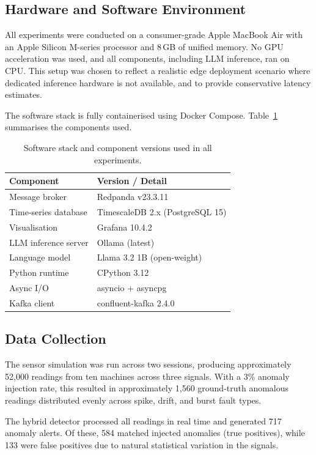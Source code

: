 \documentclass[11pt, a4paper]{article}
\begin{document}
\subsection{Hardware and Software Environment}

All experiments were conducted on a consumer-grade Apple MacBook Air 
with an Apple Silicon M-series processor and 8\,GB of unified memory. 
No GPU acceleration was used, and all components, including LLM 
inference, ran on CPU. This setup was chosen to reflect a realistic 
edge deployment scenario where dedicated inference hardware is not 
available, and to provide conservative latency estimates.

The software stack is fully containerised using Docker Compose. 
Table~\ref{tab:stack} summarises the components used.

\begin{table}[h]
\centering
\caption{Software stack and component versions used in all experiments.}
\label{tab:stack}
\begin{tabular}{ll}
\toprule
\textbf{Component} & \textbf{Version / Detail} \\
\midrule
Message broker      & Redpanda v23.3.11 \\
Time-series database & TimescaleDB 2.x (PostgreSQL 15) \\
Visualisation       & Grafana 10.4.2 \\
LLM inference server & Ollama (latest) \\
Language model      & Llama 3.2 1B (open-weight) \\
Python runtime      & CPython 3.12 \\
Async I/O           & asyncio + asyncpg \\
Kafka client        & confluent-kafka 2.4.0 \\
\bottomrule
\end{tabular}
\end{table}

\subsection{Data Collection}

The sensor simulation was run across two sessions, producing 
approximately 52,000 readings from ten machines across three signals. 
With a 3\% anomaly injection rate, this resulted in approximately 1,560 
ground-truth anomalous readings distributed evenly across spike, drift, 
and burst fault types.

The hybrid detector processed all readings in real time and generated 
717 anomaly alerts. Of these, 584 matched injected anomalies (true 
positives), while 133 were false positives due to natural statistical 
variation in the signals.
\end{document}
